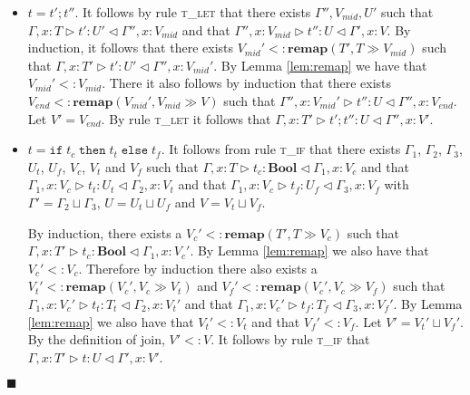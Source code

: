 \documentclass[preprint]{sigplanconf}
\newcommand{\lemref}[1]{Lemma \ref{#1}}
\newcommand{\tlet}{\textsc{t\_let} }
\newcommand{\tif}{\textsc{t\_if} }
\newcommand{\remapapp}[3]{\ensuremath{\mathbf{remap}(#1, #2 \gg #3)}}
\newcommand{\typerule}[4]{#1 \triangleright #2 : #3 \triangleleft #4}
\newcommand{\boolt}{\mathbf{Bool}}
\newcommand{\ift}[3]{\mathtt{if} \; #1 \; \mathtt{then} \; #2 \; \mathtt{else} \; #3}
\newcommand{\qed}{$\blacksquare$}
\newenvironment{proof}{\vspace{1ex}\noindent{\bf Proof}\hspace{0.5em}}
  {\hfill\qed\vspace{1ex}}
\begin{document}
\begin{proof}
\begin{itemize}
\begin{itemize}
\end{itemize}

\item $t = t' ; t''$. It follows by rule \tlet that there exists
$\Gamma'', V_{mid}, U'$ 
such that $\typerule{\Gamma, x : T}{t'}{U'}{\Gamma'', x : V_{mid}}$
and that $\typerule{\Gamma'', x : V_{mid}}{t''}{U}{\Gamma', x : V}$.
By induction, it follows that there exists $V_{mid}' <: \remapapp{T'}{T}{V_{mid}}$ 
such that $\typerule{\Gamma, x : T'}{t'}{U'}{\Gamma'', x : V_{mid}'}$.
By \lemref{lem:remap} we have that $V_{mid}' <: V_{mid}$.
There it also follows by induction that 
there exists $V_{end} <: \remapapp{V_{mid}'}{V_{mid}}{V}$ such that
$\typerule{\Gamma'', x : V_{mid}'}{t''}{U}{\Gamma'', x : V_{end}}$.
Let $V' = V_{end}$. By rule \tlet it follows that
$\typerule{\Gamma, x : T'}{t' ; t''}{U}{\Gamma'', x : V'}$.

\item $t = \ift{t_c}{t_t}{t_f}$. It follows from rule \tif that there
exists $\Gamma_1$, $\Gamma_2$, $\Gamma_3$, $U_t$, $U_f$, $V_c$, $V_t$ and
$V_f$
such that
$\typerule{\Gamma, x : T}{t_c}{\boolt}{\Gamma_1, x : V_c}$ and that
$\typerule{\Gamma_1, x : V_c}{t_t}{U_t}{\Gamma_2, x : V_t}$ and that
$\typerule{\Gamma_1, x : V_c}{t_f}{U_f}{\Gamma_3, x : V_f}$ with
$\Gamma' = \Gamma_2 \sqcup \Gamma_3$, $U = U_t \sqcup U_f$ and
$V = V_t \sqcup V_f$.

By induction, there exists a $V_c' <: \remapapp{T'}{T}{V_c}$
such that $\typerule{\Gamma, x : T'}{t_c}{\boolt}{\Gamma_1, x : V_c'}$.
By \lemref{lem:remap} we also have that $V_c' <: V_c$.
Therefore by induction there also exists a 
$V_t' <: \remapapp{V_c'}{V_c}{V_t}$ and $V_f' <: \remapapp{V_c'}{V_c}{V_f}$
such that $\typerule{\Gamma_1, x : V_c'}{t_t}{T_t}{\Gamma_2, x : V_t'}$
and that $\typerule{\Gamma_1, x : V_c'}{t_f}{T_f}{\Gamma_3, x : V_f'}$.
By \lemref{lem:remap} we also have that $V_t' <: V_t$ and that
$V_f' <: V_f$.
Let $V' = V_t' \sqcup V_f'$. By the definition of join, $V' <: V$.
It follows by rule \tif that
$\typerule{\Gamma, x : T'}{t}{U}{\Gamma', x : V'}$.

\end{itemize}
\end{proof}

\end{document}
